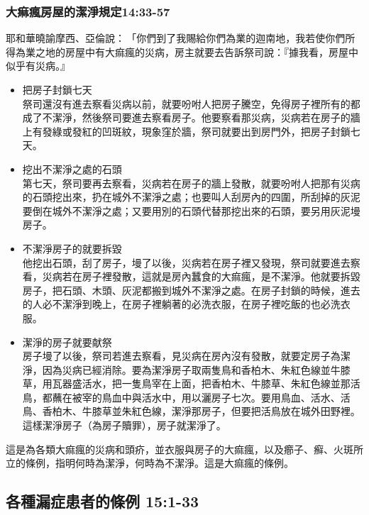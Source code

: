 \subsubsection{大痲瘋房屋的潔淨規定14:33-57}
耶和華曉諭摩西、亞倫說： 「你們到了我賜給你們為業的迦南地，我若使你們所得為業之地的房屋中有大痲瘋的災病，房主就要去告訴祭司說：『據我看，房屋中似乎有災病。』
\begin{itemize} 
\itemsep-.35em
\item 把房子封鎖七天\\
祭司還沒有進去察看災病以前，就要吩咐人把房子騰空，免得房子裡所有的都成了不潔淨，然後祭司要進去察看房子。他要察看那災病，災病若在房子的牆上有發綠或發紅的凹斑紋，現象窪於牆，祭司就要出到房門外，把房子封鎖七天。
\item 挖出不潔淨之處的石頭\\
第七天，祭司要再去察看，災病若在房子的牆上發散，就要吩咐人把那有災病的石頭挖出來，扔在城外不潔淨之處；也要叫人刮房內的四圍，所刮掉的灰泥要倒在城外不潔淨之處；又要用別的石頭代替那挖出來的石頭，要另用灰泥墁房子。
\item 不潔淨房子的就要拆毀\\
他挖出石頭，刮了房子，墁了以後，災病若在房子裡又發現，祭司就要進去察看，災病若在房子裡發散，這就是房內蠶食的大痲瘋，是不潔淨。他就要拆毀房子，把石頭、木頭、灰泥都搬到城外不潔淨之處。在房子封鎖的時候，進去的人必不潔淨到晚上，在房子裡躺著的必洗衣服，在房子裡吃飯的也必洗衣服。
\item 潔淨的房子就要献祭\\
房子墁了以後，祭司若進去察看，見災病在房內沒有發散，就要定房子為潔淨，因為災病已經消除。要為潔淨房子取兩隻鳥和香柏木、朱紅色線並牛膝草，用瓦器盛活水，把一隻鳥宰在上面，把香柏木、牛膝草、朱紅色線並那活鳥，都蘸在被宰的鳥血中與活水中，用以灑房子七次。要用鳥血、活水、活鳥、香柏木、牛膝草並朱紅色線，潔淨那房子，但要把活鳥放在城外田野裡。這樣潔淨房子（為房子贖罪），房子就潔淨了。
\end{itemize}
這是為各類大痲瘋的災病和頭疥，並衣服與房子的大痲瘋，以及癤子、癬、火斑所立的條例，指明何時為潔淨，何時為不潔淨。這是大痲瘋的條例。


\subsection{各種漏症患者的條例 15:1-33}
